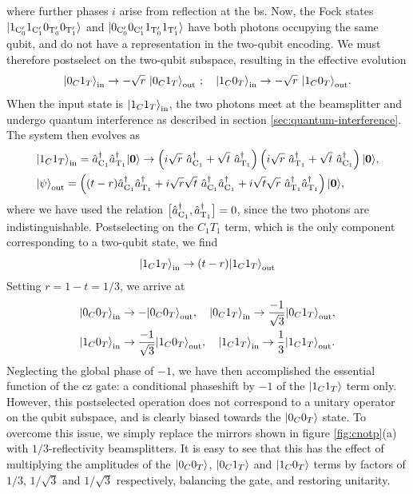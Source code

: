 where further phases $i$ arise from reflection at the \gls{bs}.
Now, the Fock states 
$\mbox{$ | 1_{\mathrm{C_0'}} 1_{\mathrm{C_1'}} 0_{\mathrm{T_0'}} 0_{\mathrm{T_1'}} \rangle $}$
and 
$\mbox{$ | 0_{\mathrm{C_0'}} 0_{\mathrm{C_1'}} 1_{\mathrm{T_0'}} 1_{\mathrm{T_1'}} \rangle $}$
have both photons occupying the same qubit, and do not have a representation in the two-qubit encoding. We must therefore postselect on the two-qubit subspace, resulting in the effective evolution
\begin{equation}
   \mbox{$ | 0_C 1_T \rangle $}_{\mathrm{in}} \rightarrow - \sqrt{r}~ \mbox{$ | 0_C 1_T \rangle $}_{\mathrm{out}} ~; \quad
   \mbox{$ | 1_C 0_T \rangle $}_{\mathrm{in}} \rightarrow - \sqrt{r}~ \mbox{$ | 1_C 0_T \rangle $}_{\mathrm{out}}.
\end{equation}
When the input state is $\mbox{$ | 1_C 1_T \rangle $}_{\mathrm{in}}$, the two photons meet at the beamsplitter and undergo quantum interference as described in section \ref{sec:quantum-interference}. The system then evolves as 
\begin{align}
   &\mbox{$ | 1_C 1_T \rangle $}_{\mathrm{in}} = \hat{a}^{\dagger}_{\mathrm{C_1}} \hat{a}^{\dagger}_{\mathrm{T_1}} \mbox{$ | \mathbf{0} \rangle $}
   \rightarrow
   \left(i \sqrt{r} ~ \hat{a}^{\dagger}_{\mathrm{C_1}} + \sqrt{t} ~ \hat{a}^{\dagger}_{\mathrm{T_1}} \right)
   \left(i \sqrt{r} ~ \hat{a}^{\dagger}_{\mathrm{T_1}} + \sqrt{t} ~ \hat{a}^{\dagger}_{\mathrm{C_1}} \right) 
   \mbox{$ | \mathbf{0} \rangle $},\\
    &\mbox{$ | \psi \rangle $}_{\mathrm{out}} = \left((t-r) \hat{a}^{\dagger}_{\mathrm{C_1}} \hat{a}^{\dagger}_{\mathrm{T_1}} + i \sqrt{r}\sqrt{t} ~ \hat{a}^{\dagger}_{\mathrm{C_1}} \hat{a}^{\dagger}_{\mathrm{C_1}} + i \sqrt{t} \sqrt{r} ~ \hat{a}^{\dagger}_{\mathrm{T_1}} \hat{a}^{\dagger}_{\mathrm{T_1}} \right) \mbox{$ | \mathbf{0} \rangle $},
\end{align}
where we have used the relation $\big[\hat{a}^{\dagger}_{\mathrm{C_1}}, \hat{a}^{\dagger}_{\mathrm{T_1}}\big] = 0$, since the two photons are indistinguishable. Postselecting on the $C_1T_1$ term, which is the only component corresponding to a two-qubit state, we find
\begin{equation}
    \mbox{$ | 1_C 1_T \rangle $}_{\mathrm{in}}  \rightarrow (t-r)\mbox{$ | 1_C 1_T \rangle $}_{\mathrm{out}}  
\end{equation}
Setting $r = 1-t = 1/3$,  we arrive at
\begin{align}
   &\mbox{$ | 0_C0_T \rangle $}_{\mathrm{in}} \rightarrow  -\mbox{$ | 0_C0_T \rangle $}_{\mathrm{out}},\quad
   \mbox{$ | 0_C1_T \rangle $}_{\mathrm{in}} \rightarrow  \frac{-1}{\sqrt{3}}\mbox{$ | 0_C1_T \rangle $}_{\mathrm{out}}, \notag \\
   &\mbox{$ | 1_C0_T \rangle $}_{\mathrm{in}} \rightarrow \frac{-1}{\sqrt{3}}\mbox{$ | 1_C0_T \rangle $}_{\mathrm{out}},\quad
   \mbox{$ | 1_C1_T \rangle $}_{\mathrm{in}} \rightarrow \frac{1}{3}\mbox{$ | 1_C1_T \rangle $}_{\mathrm{out}}.
\end{align}
Neglecting the global phase of $-1$, we have then accomplished the essential function of the \gls{cz} gate: a conditional phaseshift by $-1$ of the $\mbox{$ | 1_C1_T \rangle $}$ term only. However, this postselected operation does not correspond to a unitary operator on the qubit subspace, and is clearly biased towards the $\mbox{$ | 0_C0_T \rangle $}$ state.  To overcome this issue, we simply replace the mirrors shown in figure \ref{fig:cnotp}(a) with $1/3$-reflectivity beamsplitters. It is easy to see that this has the effect of multiplying the amplitudes of the $\mbox{$ | 0_C0_T \rangle $}$, $\mbox{$ | 0_C1_T \rangle $}$ and $\mbox{$ | 1_C0_T \rangle $}$ terms by factors of $1/3$, $1/\sqrt{3}$ and $1/\sqrt{3}$ respectively, balancing the gate, and restoring unitarity. 
